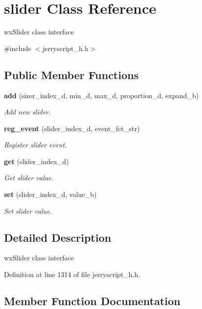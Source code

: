 \section{slider Class Reference}
\label{classslider}


wx\+Slider class interface  




{\ttfamily \#include $<$jerryscript\+\_\+h.\+h$>$}

\subsection*{Public Member Functions}
\begin{DoxyCompactItemize}
\item 
\textbf{ add} (sizer\+\_\+index\+\_\+d, min\+\_\+d, max\+\_\+d, proportion\+\_\+d, expand\+\_\+b)
\begin{DoxyCompactList}\small\item\em Add new slider. \end{DoxyCompactList}\item 
\textbf{ reg\+\_\+event} (slider\+\_\+index\+\_\+d, event\+\_\+fct\+\_\+str)
\begin{DoxyCompactList}\small\item\em Register slider event. \end{DoxyCompactList}\item 
\textbf{ get} (slider\+\_\+index\+\_\+d)
\begin{DoxyCompactList}\small\item\em Get slider value. \end{DoxyCompactList}\item 
\textbf{ set} (slider\+\_\+index\+\_\+d, value\+\_\+b)
\begin{DoxyCompactList}\small\item\em Set slider value. \end{DoxyCompactList}\end{DoxyCompactItemize}


\subsection{Detailed Description}
wx\+Slider class interface 

Definition at line 1314 of file jerryscript\+\_\+h.\+h.



\subsection{Member Function Documentation}
\mbox{\label{classslider_acb93b8c322d92ee1a45baf0f01a6acb6}} 
